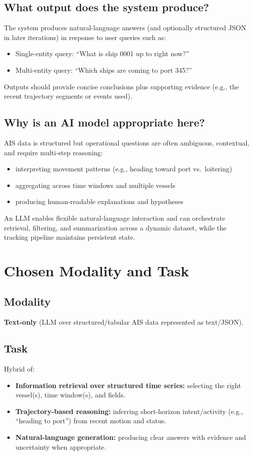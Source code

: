 \documentclass[11pt]{article}
\begin{document}
\subsection*{What output does the system produce?}
The system produces natural-language answers (and optionally structured JSON in later iterations) in response to user queries such as:
\begin{itemize}
  \item Single-entity query: ``What is ship 0001 up to right now?''
  \item Multi-entity query: ``Which ships are coming to port 345?''
\end{itemize}
Outputs should provide concise conclusions plus supporting evidence (e.g., the recent trajectory segments or events used).

\subsection*{Why is an AI model appropriate here?}
AIS data is structured but operational questions are often ambiguous, contextual, and require multi-step reasoning:
\begin{itemize}
  \item interpreting movement patterns (e.g., heading toward port vs.\ loitering)
  \item aggregating across time windows and multiple vessels
  \item producing human-readable explanations and hypotheses
\end{itemize}
An LLM enables flexible natural-language interaction and can orchestrate retrieval, filtering, and summarization across a dynamic dataset, while the tracking pipeline maintains persistent state.

\section{Chosen Modality and Task}
\subsection*{Modality}
\textbf{Text-only} (LLM over structured/tabular AIS data represented as text/JSON).

\subsection*{Task}
Hybrid of:
\begin{itemize}
  \item \textbf{Information retrieval over structured time series:} selecting the right vessel(s), time window(s), and fields.
  \item \textbf{Trajectory-based reasoning:} inferring short-horizon intent/activity (e.g., ``heading to port'') from recent motion and status.
  \item \textbf{Natural-language generation:} producing clear answers with evidence and uncertainty when appropriate.
\end{itemize}
\end{document}

